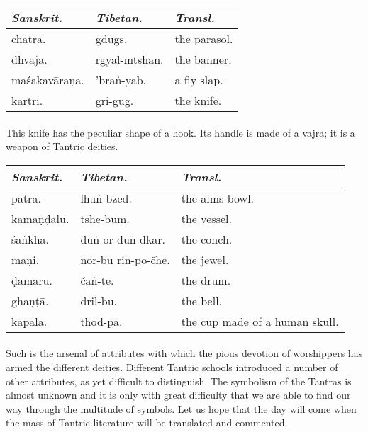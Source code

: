 \documentclass[a4paper, 12pt, oneside]{article}
\begin{document}
\begin{table}[H]
    \centering
    \small
    \begin{tabular}{l l l}
           \emph{Sanskrit.}  &  \emph{Tibetan.}  &  \emph{Transl.}           \\ \hline
        chatra.        &  gdugs.         &  the parasol.  \\
         dhvaja.        &  rgyal-mtshan.  &  the banner.   \\
         ma\'{s}akav\={a}ra\d{n}a.  &  'bra\.{n}-yab.     &  a fly slap.   \\
         kartr\={\i}.        &  gri-gug.       &  the knife. \\
    \end{tabular}
\end{table}
\paragraph{}
This knife has the peculiar shape of a hook. Its handle is made of a vajra; it is a weapon of Tantric deities.

\begin{table}[H]
    \centering
    \small
    \begin{tabular}{l l l}
           \emph{Sanskrit.}  &  \emph{Tibetan.}  &  \emph{Transl.}           \\ \hline
        patra.      &  lhu\.{n}-bzed.          &  the alms bowl.                  \\
         kama\d{n}\d{d}alu.  &  tshe-bum.           &  the vessel.                     \\
         \'{s}a\.{n}kha.     &  du\.{n} or du\.{n}-dkar.    &  the conch.                      \\
         ma\d{n}i.       &  nor-bu rin-po-čhe.  &  the jewel.                      \\
         \d{d}amaru.     &  ča\.{n}-te.             &  the drum.                       \\
         gha\d{n}\d{t}\={a}.     &  dril-bu.            &  the bell.                       \\
         kap\={a}la.     &  thod-pa.            &  the cup made of a human skull. \\
    \end{tabular}
\end{table}
\paragraph{}
Such is the arsenal of attributes with which the pious devotion of worshippers has armed the different deities. Different Tantric schools introduced a number of other attributes, as yet difficult to distinguish. The symbolism of the Tantras is almost unknown and it is only with great difficulty that we are able to find our way through the multitude of symbols. Let us hope that the day will come when the mass of Tantric literature will be translated and commented.
\end{document}
